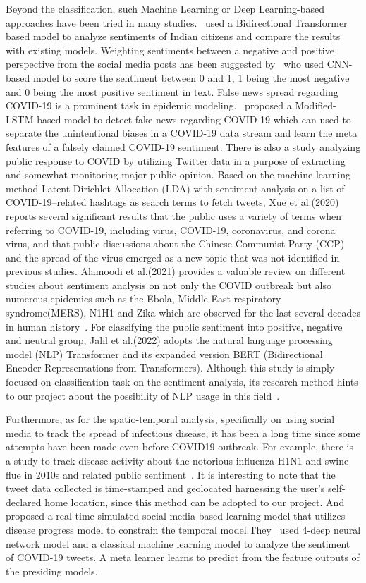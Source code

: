 Beyond the classification, such Machine Learning or Deep Learning-based
approaches have been tried in many studies.~\cite
{chintalapudi2021sentimental} used a Bidirectional Transformer based model to
analyze sentiments of Indian citizens and compare the results with existing
models. Weighting sentiments between a negative and positive perspective from
the social media posts has been suggested by~\cite{alshalan2020detection} who
used CNN-based model to score the sentiment between 0 and 1, 1 being the most
negative and 0 being the most positive sentiment in text. False news spread
regarding COVID-19 is a prominent task in epidemic modeling.~\cite
{abdelminaam2021coaid} proposed a Modified-LSTM based model to detect fake
news regarding COVID-19 which can used to separate the unintentional biases
in a COVID-19 data stream and learn the meta features of a falsely claimed
COVID-19 sentiment. There is also a study analyzing public response to COVID
by utilizing Twitter data in a purpose of extracting and somewhat monitoring
major public opinion. Based on the machine learning method Latent Dirichlet
Allocation (LDA) with sentiment analysis on a list of COVID-19–related
hashtags as search terms to fetch tweets, Xue et al.(2020) reports several
significant results that the public uses a variety of terms when referring to
COVID-19, including virus, COVID-19, coronavirus, and corona virus, and that
public discussions about the Chinese Communist Party (CCP) and the spread of
the virus emerged as a new topic that was not identified in previous studies.
Alamoodi et al.(2021) provides a valuable review on different studies about
sentiment analysis on not only the COVID outbreak but also numerous epidemics
such as the Ebola, Middle East respiratory syndrome(MERS), N1H1 and Zika
which are observed for the last several decades in human history~\cite
{alamoodi2021sentiment}. For classifying the public sentiment into positive,
negative and neutral group, Jalil et al.(2022) adopts the natural language
processing model (NLP) Transformer and its expanded version BERT
(Bidirectional Encoder Representations from Transformers). Although this
study is simply focused on classification task on the sentiment analysis, its
research method hints to our project about the possibility of NLP usage in
this field~\cite{jalil2021covid}.

Furthermore, as for the spatio-temporal analysis, specifically on using social
media to track the spread of infectious disease, it has been a long time
since some attempts have been made even before COVID19 outbreak. For example,
there is a study to track disease activity about the notorious influenza H1N1
and swine flue in 2010s and related public sentiment~\cite
{signorini2011use}. It is interesting to note that the tweet data collected
is time-stamped and geolocated harnessing the user’s self-declared home
location, since this method can be adopted to our project. And~\cite
{signorini2011use} proposed a real-time simulated social media based learning
model that utilizes disease progress model to constrain the temporal
model.They~\cite{basiri2021novel} used 4-deep neural network model and a
classical machine learning model to analyze the sentiment of COVID-19 tweets.
A meta learner learns to predict from the feature outputs of the presiding
models.

